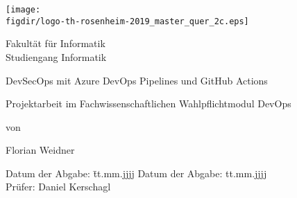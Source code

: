 \begin{titlepage}

\sffamily

\raggedleft

\vspace*{-2cm}

\texttt{[image: \\figdir/logo-th-rosenheim-2019\_master\_quer\_2c.eps]}

\vfill

\centering
\LARGE
Fakultät für Informatik  \vspace{0.5cm}\\
\Large
Studiengang Informatik

\vspace{2cm}

\LARGE

DevSecOps mit Azure DevOps Pipelines und GitHub Actions

\vspace{2cm}

\Large
Projektarbeit im Fachwissenschaftlichen Wahlpflichtmodul DevOps

\vspace{1.5cm}


\Large
von

\vspace{0.5cm}


\LARGE
Florian Weidner \vspace{1cm}

\vspace{1cm}

\flushleft
 \Large
\vspace*{\fill}

\begin{tabbing}
Datum der Abgabe: \= tt.mm.jjjj \kill
Datum der Abgabe: \> tt.mm.jjjj \\
Prüfer: \> Daniel Kerschagl \\

\end{tabbing}

\end{titlepage}